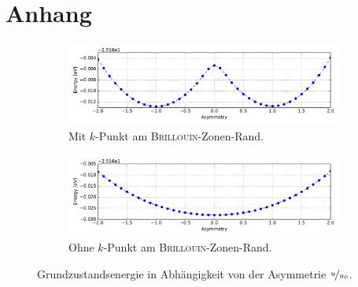\section*{Anhang}

\begin{frame}
\begin{figure}
	\centering
	\begin{subfigure}{.85\textwidth}
	\centering
	\includegraphics[width = \textwidth]{Images/polyacetylene/convergence/Potential_with_asymmetry}
	\caption{Mit $k$-Punkt am \textsc{Brillouin}-Zonen-Rand.}
	\label{image_potential_with_asymmetry}
	\end{subfigure}
	\begin{subfigure}{.85\textwidth}
	\centering
	\includegraphics[width = \textwidth]{Images/polyacetylene/convergence/Potential_without_asymmetry}
	\caption{Ohne $k$-Punkt am \textsc{Brillouin}-Zonen-Rand.}
	\label{image_potential_without_asymmetry}
	\end{subfigure}
	\caption{Grundzustandsenergie in Abhängigkeit von der Asymmetrie $\nicefrac{u}{u_0}$.}
\end{figure}
\end{frame}

